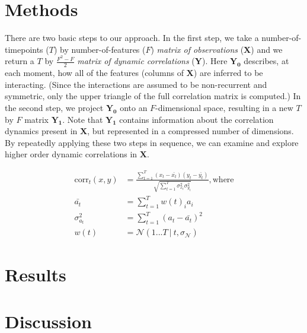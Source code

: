 \documentclass[english]{article}
\begin{document}
\section*{Methods}
There are two basic steps to our approach.  In the first step, we take
a number-of-timepoints ($T$) by number-of-features ($F$)
\textit{matrix of observations} ($\mathbf{X}$) and we return a $T$ by
$\frac{F^2 - F}{2}$ \textit{matrix of dynamic correlations}
($\mathbf{Y}$).  Here $\mathbf{Y_0}$ describes, at each moment, how
all of the features (columns of $\mathbf{X}$) are inferred to be
interacting.  (Since the interactions are assumed to be non-recurrent
and symmetric, only the upper triangle of the full correlation matrix
is computed.)  In the second step, we project $\mathbf{Y_0}$ onto an
$F$-dimensional space, resulting in a new $T$ by $F$ matrix
$\mathbf{Y_1}$.  Note that $\mathbf{Y_1}$ contains information about
the correlation dynamics present in $\mathbf{X}$, but represented in a
compressed number of dimensions.  By repeatedly applying these two
steps in sequence, we can examine and explore higher order dynamic
correlations in $\mathbf{X}$.



\begin{align}
\mathrm{corr}_t(x,y) &= \frac{\sum_{t=1}^T \left( x_t - \bar{x_t} \right) \left( y_t - \bar{y_t} \right)}{\sqrt{\sum_{t=1}^{T}\sigma ^{2}_{x_{t}}\sigma ^{2}_{y_{t}}}}\mathrm{, where}\\
\bar{a_t} &= \sum_{t=1}^T w(t)_i a_i\\
\sigma^{2}_{a_t} &= \sum_{t=1}^{T} \left(a_t - \bar{a_t} \right)^2\\
w(t) &= \mathcal{N}\left(1...T ~|~ t, \sigma_\mathcal{N}\right) %
\end{align}






\section*{Results}

\section*{Discussion}
\end{document}
